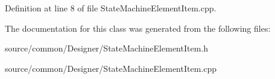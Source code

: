 Definition at line 8 of file State\-Machine\-Element\-Item.\-cpp.



The documentation for this class was generated from the following files\-:\begin{DoxyCompactItemize}
\item 
source/common/\-Designer/State\-Machine\-Element\-Item.\-h\item 
source/common/\-Designer/State\-Machine\-Element\-Item.\-cpp\end{DoxyCompactItemize}
